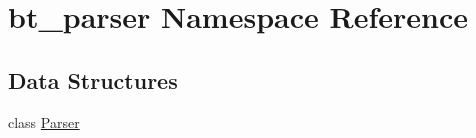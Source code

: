 \hypertarget{namespacebt__parser}{\section{bt\-\_\-parser Namespace Reference}
\label{namespacebt__parser}
}
\subsection*{Data Structures}
\begin{DoxyCompactItemize}
\item 
class \hyperlink{classbt__parser_1_1Parser}{Parser}
\end{DoxyCompactItemize}
